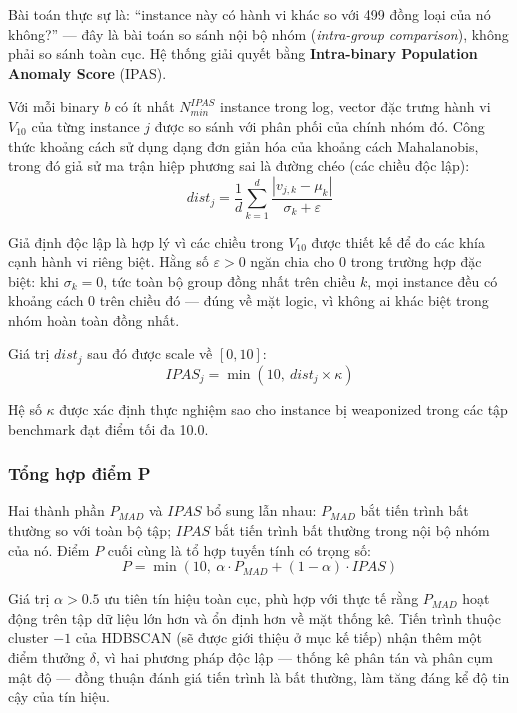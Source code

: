 \documentclass[../main.tex]{subfiles}
\begin{document}
Bài toán thực sự là: ``instance này có hành vi khác so với 499 đồng loại của nó không?'' — đây là bài toán so sánh nội bộ nhóm (\textit{intra-group comparison}), không phải so sánh toàn cục. Hệ thống giải quyết bằng \textbf{Intra-binary Population Anomaly Score} (IPAS).

Với mỗi binary $b$ có ít nhất $N_{min}^{IPAS}$ instance trong log, vector đặc trưng hành vi $V_{10}$ của từng instance $j$ được so sánh với phân phối của chính nhóm đó. Công thức khoảng cách sử dụng dạng đơn giản hóa của khoảng cách Mahalanobis, trong đó giả sử ma trận hiệp phương sai là đường chéo (các chiều độc lập):
\begin{equation}
    dist_j = \frac{1}{d} \sum_{k=1}^{d} \frac{|v_{j,k} - \mu_k|}{\sigma_k + \varepsilon} \tag{1.10}
\end{equation}

Giả định độc lập là hợp lý vì các chiều trong $V_{10}$ được thiết kế để đo các khía cạnh hành vi riêng biệt. Hằng số $\varepsilon > 0$ ngăn chia cho 0 trong trường hợp đặc biệt: khi $\sigma_k = 0$, tức toàn bộ group đồng nhất trên chiều $k$, mọi instance đều có khoảng cách 0 trên chiều đó — đúng về mặt logic, vì không ai khác biệt trong nhóm hoàn toàn đồng nhất.

Giá trị $dist_j$ sau đó được scale về $[0, 10]$:
\begin{equation}
    IPAS_j = \min(10,\ dist_j \times \kappa) \tag{1.11}
\end{equation}

Hệ số $\kappa$ được xác định thực nghiệm sao cho instance bị weaponized trong các tập benchmark đạt điểm tối đa 10.0.

\subsubsection{Tổng hợp điểm P}
\label{subsubsection:2.4.2.3}

Hai thành phần $P_{MAD}$ và $IPAS$ bổ sung lẫn nhau: $P_{MAD}$ bắt tiến trình bất thường so với toàn bộ tập; $IPAS$ bắt tiến trình bất thường trong nội bộ nhóm của nó. Điểm $P$ cuối cùng là tổ hợp tuyến tính có trọng số:
\begin{equation}
    P = \min(10,\ \alpha \cdot P_{MAD} + (1-\alpha) \cdot IPAS) \tag{1.12}
\end{equation}

Giá trị $\alpha > 0.5$ ưu tiên tín hiệu toàn cục, phù hợp với thực tế rằng $P_{MAD}$ hoạt động trên tập dữ liệu lớn hơn và ổn định hơn về mặt thống kê. Tiến trình thuộc cluster $-1$ của HDBSCAN (sẽ được giới thiệu ở mục kế tiếp) nhận thêm một điểm thưởng $\delta$, vì hai phương pháp độc lập — thống kê phân tán và phân cụm mật độ — đồng thuận đánh giá tiến trình là bất thường, làm tăng đáng kể độ tin cậy của tín hiệu.
\end{document}
